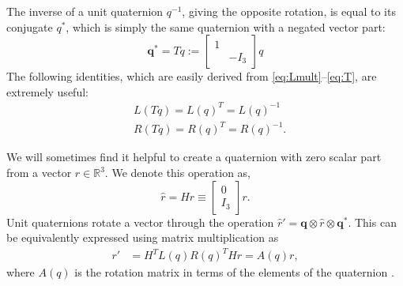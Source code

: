 \documentclass[letterpaper, 10 pt, conference]{ieeeconf}  %
\newcommand{\R}{\mathbb{R}}
\newcommand{\q}{\textbf{q}}
\begin{document}
        The inverse of a unit quaternion $q^{-1}$, giving the opposite rotation, is equal 
        to its conjugate $q^*$, which is simply the same quaternion with a negated vector 
        part:
        \begin{equation} \label{eq:T}
            \q^* = T q := \begin{bmatrix} 
                1 & \\ 
                & -I_3 
            \end{bmatrix} q
        \end{equation}
        The following identities, which are easily derived from
        \eqref{eq:Lmult}--\eqref{eq:T}, are extremely useful:
        \begin{align}
            &L(Tq) = L(q)^T = L(q)^{-1} \\
            &R(Tq) = R(q)^T = R(q)^{-1} .
        \end{align}
        
        We will sometimes find it helpful to create a quaternion with zero scalar part from 
        a vector $r \in \R^3$. We denote this operation as,
        \begin{equation}
            \hat{r} = H r \equiv \begin{bmatrix} 0 \\ I_3 \end{bmatrix} r.
        \end{equation}
        Unit quaternions rotate a vector through the operation 
        $\hat{r}' = \q \otimes \hat{r} \otimes \q^*$. 
        This can be equivalently expressed using matrix multiplication as
        \begin{align} 
            r' &= H^T L(q) R(q)^T H r = A(q)r , \label{eq:quaternion_rotation}
        \end{align}
        where $A(q)$ is the rotation matrix in terms of the elements of the quaternion 
        \cite{kane1983spacecraftdynamics}.
\end{document}
